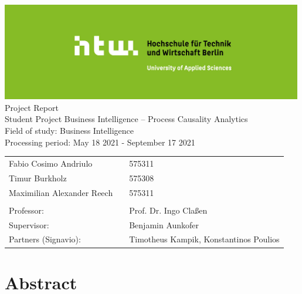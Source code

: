 \def\title{Student Project Business Intelligence – Process Causality Analytics}
\def\author{Fabio Cosimo Andriulo, Timur Burkholz, Maximilian Alexabder Reech}
\begin{titlepage}
    \begin{center}
        \includegraphics[width=0.99\textwidth]{includes/csm_Logos_1330x430_612fe2f37a.jpg}\\
        \vspace{24pt}
        \small{Project Report}\\
        \vspace{24pt}
        \huge{\title{}}\\
        \vspace{36pt}
        \small{Field of study: Business Intelligence}\\
        \small{Processing period: May 18 2021 - September 17 2021}
    \end{center}
    \begin{table}[H]
        \centering
        \begin{tabular}{lll}
            \small Fabio Cosimo Andriulo            & \hspace{96pt} & \small 575311\\
            \small Timur Burkholz                   & \hspace{96pt} & \small 575308\\
            \small Maximilian Alexander Reech       & \hspace{96pt} & \small 575311\\
            \\
            \small Professor:                       & \hspace{96pt} & \small Prof. Dr. Ingo Claßen\\
            \small Supervisor:                      & \hspace{96pt} & \small Benjamin Aunkofer\\
            \small Partners (Signavio):             & \hspace{96pt} & \small Timotheus Kampik, Konstantinos Poulios\\
        \end{tabular}
    \end{table}
\end{titlepage}
\clearpage

\chapter*{Abstract}
\blindtext
\clearpage

\ohead{\pagemark}

\tableofcontents

\listoffigures
{}

\listoftables
{}
\clearpage